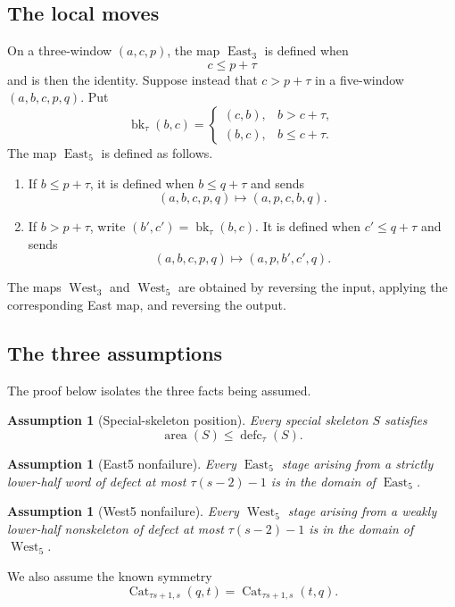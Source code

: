 \documentclass[11pt]{article}
\newtheorem{assumption}[theorem]{Assumption}
\theoremstyle{definition}
\theoremstyle{remark}
\newcommand{\area}{\operatorname{area}}
\newcommand{\defc}{\operatorname{defc}}
\newcommand{\East}{\operatorname{East}}
\newcommand{\West}{\operatorname{West}}
\newcommand{\bk}{\operatorname{bk}}
\newcommand{\Cat}{\operatorname{Cat}}
\begin{document}
\subsection{The local moves}

On a three-window $(a,c,p)$, the map $\East_3$ is defined when
\[
  c\le p+\tau
\]
and is then the identity.  Suppose instead that $c>p+\tau$ in a
five-window $(a,b,c,p,q)$.  Put
\[
  \bk_\tau(b,c)=
  \begin{cases}
    (c,b),&b>c+\tau,\\
    (b,c),&b\le c+\tau.
  \end{cases}
\]
The map $\East_5$ is defined as follows.
\begin{enumerate}
\item If $b\le p+\tau$, it is defined when $b\le q+\tau$ and sends
\[
  (a,b,c,p,q)\longmapsto(a,p,c,b,q).
\]
\item If $b>p+\tau$, write $(b',c')=\bk_\tau(b,c)$.  It is defined when
$c'\le q+\tau$ and sends
\[
  (a,b,c,p,q)\longmapsto(a,p,b',c',q).
\]
\end{enumerate}
The maps $\West_3$ and $\West_5$ are obtained by reversing the input,
applying the corresponding East map, and reversing the output.

\subsection{The three assumptions}

The proof below isolates the three facts being assumed.

\begin{assumption}[Special-skeleton position]
\label{ass:skeleton-area}
Every special skeleton $S$ satisfies
\[
  \area(S)\le\defc_\tau(S).
\]
\end{assumption}

\begin{assumption}[East5 nonfailure]
\label{ass:east5}
Every $\East_5$ stage arising from a strictly lower-half word of defect at
most $\tau(s-2)-1$ is in the domain of $\East_5$.
\end{assumption}

\begin{assumption}[West5 nonfailure]
\label{ass:west5}
Every $\West_5$ stage arising from a weakly lower-half nonskeleton of defect
at most $\tau(s-2)-1$ is in the domain of $\West_5$.
\end{assumption}

We also assume the known symmetry
\[
  \Cat_{\tau s+1,s}(q,t)=\Cat_{\tau s+1,s}(t,q).
\]
\end{document}
